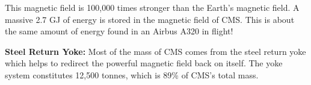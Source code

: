 This magnetic field is 100,000 times stronger than the Earth's magnetic field.
A massive 2.7 GJ of energy is stored in the magnetic field of CMS. 
This is about the same amount of energy found in an Airbus A320 in flight!

\textbf{Steel Return Yoke:} 
Most of the mass of CMS comes from the steel return yoke which helps to redirect the powerful magnetic field back on itself. 
The yoke system constitutes 12,500 tonnes, which is 89\% of CMS's total mass.
